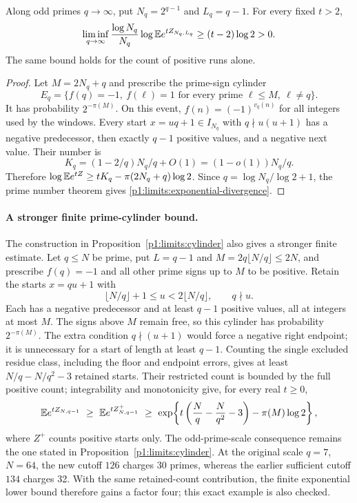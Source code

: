 \begin{proposition}
\label{p1:limits:cylinder}
Along odd primes $q\to\infty$, put $N_q=2^{q-1}$ and
$L_q=q-1$.  For every fixed $t>2$,
\begin{equation}
 \liminf_{q\to\infty}\frac{\log N_q}{N_q}
        \log\mathbb E e^{tZ_{N_q,L_q}}\ge(t-2)\log2>0.
 \label{p1:limits:exponential-divergence}
\end{equation}
The same bound holds for the count of positive runs alone.
\end{proposition}
\begin{proof}
Let $M=2N_q+q$ and prescribe the prime-sign cylinder
\[
 E_q=\{f(q)=-1,\ f(\ell)=1
             \text{ for every prime }\ell\le M,\ \ell\ne q\}.
\]
It has probability $2^{-\pi(M)}$.  On this event,
$f(n)=(-1)^{v_q(n)}$ for all integers used by the windows.
Every start $x=uq+1\in I_{N_q}$ with $q\nmid u(u+1)$ has a
negative predecessor, then exactly $q-1$ positive values, and
a negative next value.  Their number is
\[
 K_q=(1-2/q)N_q/q+O(1)=(1-o(1))N_q/q.
\]
Therefore
$\log\mathbb E e^{tZ}\ge tK_q-\pi(2N_q+q)\log2$.
Since $q=\log N_q/\log2+1$, the prime number theorem gives
\eqref{p1:limits:exponential-divergence}.
\end{proof}

\paragraph{A stronger finite prime-cylinder bound.}
The construction in Proposition~\ref{p1:limits:cylinder} also gives a
stronger finite estimate.  Let $q\leq N$ be prime, put $L=q-1$ and
$M=2q\lfloor N/q\rfloor\leq2N$, and prescribe $f(q)=-1$ and all other prime signs up to
$M$ to be positive.  Retain the starts $x=qu+1$ with
\[
 \lfloor N/q\rfloor+1\leq u<2\lfloor N/q\rfloor,
 \qquad q\nmid u.
\]
Each has a negative predecessor and at least $q-1$ positive values,
all at integers at most $M$.  The signs above $M$ remain free, so this
cylinder has probability $2^{-\pi(M)}$.
The extra condition $q\nmid(u+1)$ would force a negative right endpoint;
it is unnecessary for a start of length at least $q-1$.
Counting the single excluded residue class, including the floor and
endpoint errors, gives at least $N/q-N/q^2-3$ retained starts.
Their restricted count is bounded by the full positive count;
integrability and monotonicity give, for every real $t\geq0$,
\[
 \mathbb E e^{tZ_{N,q-1}}\ \geq\ \mathbb E e^{tZ^+_{N,q-1}}
 \ \geq\
 \exp\!\left\{t\left(\frac Nq-\frac N{q^2}-3\right)
                    -\pi(M)\log2\right\},
\]
where $Z^+$ counts positive starts only.  The odd-prime-scale consequence remains the one stated in
Proposition~\ref{p1:limits:cylinder}.
At the original scale $q=7$, $N=64$, the new cutoff $126$ charges
30 primes, whereas the earlier sufficient cutoff $134$ charges 32.
With the same retained-count contribution, the finite exponential lower
bound therefore gains a factor four; this exact example is also checked.

